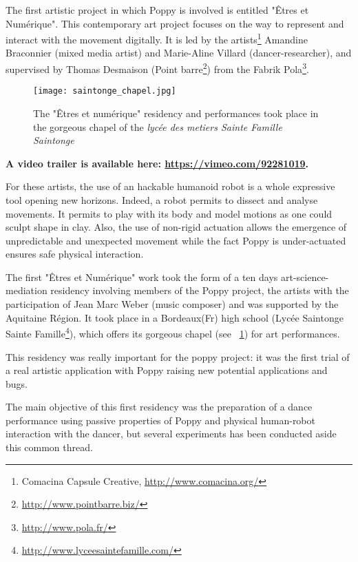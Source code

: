 The first artistic project in which Poppy is involved is entitled "Êtres et Numérique". This contemporary art project focuses on the way to represent and interact with the movement digitally. It is led by the artists\footnote{Comacina Capsule Creative, \url{http://www.comacina.org/}} Amandine Braconnier (mixed media artist) and Marie-Aline Villard (dancer-researcher), and supervised by Thomas Desmaison (Point barre\footnote{\url{http://www.pointbarre.biz/}}) from the Fabrik Pola\footnote{\url{http://www.pola.fr/}}.

\begin{figure}[t]
    \begin{center}
        \texttt{[image: saintonge\_chapel.jpg]}
    \end{center}
    \caption{The "Êtres et numérique" residency and performances took place in the gorgeous chapel of the \emph{lycée des metiers Sainte Famille Saintonge}}
    \label{fig:saintonge_chapel}
\end{figure}

\textbf{A video trailer is available here: \url{https://vimeo.com/92281019}.}

For these artists, the use of an hackable humanoid robot is a whole expressive tool opening new horizons. Indeed, a robot permits to dissect and analyse movements. It permits to play with its body and model motions as one could sculpt shape in clay. Also, the use of non-rigid actuation allows the emergence of unpredictable and unexpected movement while the fact Poppy is under-actuated ensures safe physical interaction.


The first "Êtres et Numérique" work took the form of a ten days art-science-mediation residency involving members of the Poppy project, the artists with the participation of Jean Marc Weber (music composer) and was supported by the Aquitaine Région. It took place in a Bordeaux(Fr) high school (Lycée Saintonge Sainte Famille\footnote{\url{http://www.lyceesaintefamille.com/}}), which offers its gorgeous chapel (see \figurename~\ref{fig:saintonge_chapel}) for art performances.


This residency was really important for the poppy project: it was the first trial of a real artistic application with Poppy raising new potential applications and bugs.

The main objective of this first residency was the preparation of a dance performance using passive properties of Poppy and physical human-robot interaction with the dancer, but several experiments has been conducted aside this common thread.


